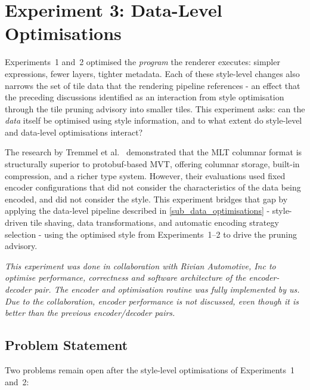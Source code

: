 \section{Experiment 3: Data-Level Optimisations}\label{sec_exp_mlt}

Experiments~1 and~2 optimised the \emph{program} the renderer executes: simpler expressions, fewer layers, tighter metadata.
Each of these style-level changes also narrows the set of tile data that the rendering pipeline references - an effect that the preceding discussions identified as an interaction from style optimisation through the tile pruning advisory into smaller tiles.
This experiment asks: can the \emph{data} itself be optimised using style information, and to what extent do style-level and data-level optimisations interact?

The research by Tremmel et al.~\cite{tremmelMapLibreTileNext2025} demonstrated that the \ac{MLT} columnar format is structurally superior to protobuf-based \ac{MVT}, offering columnar storage, built-in compression, and a richer type system.
However, their evaluations used fixed encoder configurations that did not consider the characteristics of the data being encoded, and did not consider the style.
This experiment bridges that gap by applying the data-level pipeline described in \cref{sub_data_optimisations} - style-driven tile shaving, data transformations, and automatic encoding strategy selection - using the optimised style from Experiments~1--2 to drive the pruning advisory.

\textit{This experiment was done in collaboration with Rivian Automotive, Inc to optimise performance, correctness and software architecture of the encoder-decoder pair. The encoder and optimisation routine was fully implemented by us. Due to the collaboration, encoder performance is not discussed, even though it is better than the previous encoder/decoder pairs.}

\subsection{Problem Statement}\label{sub_mlt_problem}

Two problems remain open after the style-level optimisations of Experiments~1 and~2:

